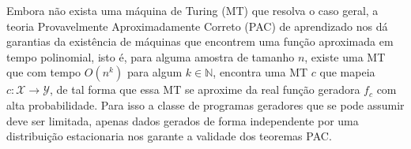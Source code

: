 Embora não exista uma máquina de Turing (MT) que resolva o caso geral, a teoria
Provavelmente Aproximadamente Correto (PAC) de aprendizado nos dá garantias da
existência de máquinas que encontrem uma função aproximada em tempo polinomial,
isto é, para alguma amostra de tamanho $n$, existe uma MT que com tempo $O(n^k)$
para algum $k \in \mathbb{N}$, encontra uma MT $c$ que mapeia
$c:\mathcal{X}\rightarrow\mathcal{Y}$, de tal forma que essa MT se aproxime da
real função geradora $f_c$ com alta probabilidade. Para isso a classe de
programas geradores que se pode assumir deve ser limitada, apenas dados gerados
de forma independente por uma distribuição estacionaria nos garante a validade
dos teoremas PAC.





